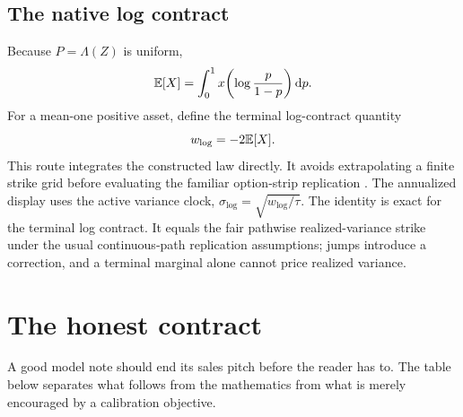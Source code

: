 \documentclass[11pt]{article}
\begin{document}
\subsection{The native log contract}

Because $P=\Lambda(Z)$ is uniform,
\begin{equation}
\mathbb{E}[X]=\int_0^1x\!\left(\log\frac{p}{1-p}\right)\mathrm{d} p.
\label{eq:mean_log_return}
\end{equation}
For a mean-one positive asset, define the terminal log-contract quantity
\begin{equation}
w_{\log}=-2\mathbb{E}[X].
\label{eq:log_contract}
\end{equation}
This route integrates the constructed law directly.  It avoids extrapolating a
finite strike grid before evaluating the familiar option-strip replication
\cite{gatheral}.  The annualized display uses the active variance clock,
$\sigma_{\log}=\sqrt{w_{\log}/\tau}$.  The identity is exact for the terminal
log contract.  It equals the fair pathwise realized-variance strike under the
usual continuous-path replication assumptions; jumps introduce a correction,
and a terminal marginal alone cannot price realized variance.

\section{The honest contract}
\label{sec:contract}

A good model note should end its sales pitch before the reader has to.  The
table below separates what follows from the mathematics from what is merely
encouraged by a calibration objective.
\end{document}
